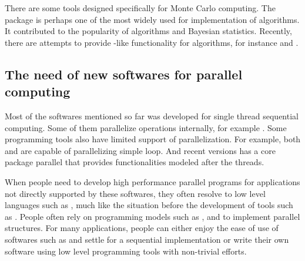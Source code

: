 There are some tools designed specifically for Monte Carlo computing. The
\bugs \cite{bugs} package is perhaps one of the most widely used for
implementation of \mcmc algorithms. It contributed to the popularity of \mcmc
algorithms and Bayesian statistics. Recently, there are attempts to provide
\bugs-like functionality for \smc algorithms, for instance \biips \cite{biips}
and \libbi \cite{libbi}.

\subsection{The need of new softwares for parallel computing}
\label{sub:The need of new softwares for parallel computing}

Most of the softwares mentioned so far was developed for single thread
sequential computing. Some of them parallelize operations internally, for
example \libbi. Some programming tools also have limited support of
parallelization. For example, both \matlab and \mathematica are capable of
parallelizing simple loop. And recent versions \rlang has a core package
\textsf{parallel} that provides functionalities modeled after the \unix
threads.

When people need to develop high performance parallel programs for
applications not directly supported by these softwares, they often resolve to
low level languages such as \cpp, much like the situation before the
development of tools such as \slang. People often rely on programming models
such as \openmp \cite{openmp}, \tbb \cite{tbb} and \mpi \cite{mpi} to
implement parallel structures. For many applications, people can either enjoy
the ease of use of softwares such as \rlang and settle for a sequential
implementation or write their own software using low level programming tools
with non-trivial efforts.

